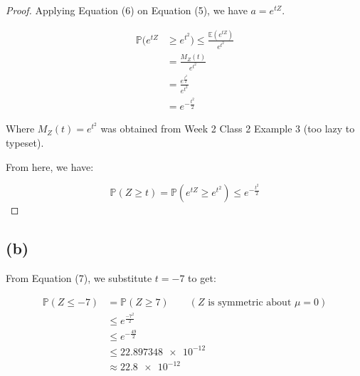 \documentclass[12pt]{article}
\begin{document}
\begin{proof} Applying Equation (6) on Equation (5), we have $a = e^{tZ}$. 

\begin{align*}
    \mathbb{P}(e^{tZ} &\geq e^{t^{2}}) \leq \frac{ \mathbb{E}(e^{tZ})}{e^{t^{2}}} \\ 
    &= \frac{M_Z (t)}{e^{t^{2}}} \\ 
    &= \frac{e^{\frac{t^{2}}{2}}}{e^{t^{2}}} \\ 
    &= e^{-\frac{t^{2}}{2}}
\end{align*}

\noindent Where $M_Z (t) = e^{t^{2}}$ was obtained from Week 2 Class 2 Example 3 (too lazy to typeset).

\noindent From here, we have:

\begin{equation}
    \boxed{ \mathbb{P}(Z \geq t) = \mathbb{P}(e^{tZ} \geq e^{t^{2}}) \leq e^{-\frac{t^{2}}{2}}}
\end{equation}

\end{proof}

\subsection*{(b)}
From Equation (7), we substitute $t = -7$ to get: 

\begin{align*}
    \mathbb{P}(Z \leq -7) &= \mathbb{P}(Z \geq 7) \qquad (\text{$Z$ is symmetric about $\mu=0$}) \\ 
    &\leq  e^{\frac{-7^{2}}{2}} \\ 
    &\leq  e^{-\frac{49}{2}} \\ 
    &\leq  \num{22.897348e-12} \\ 
    &\approx \boxed{\num{22.8e-12}}
\end{align*}
\end{document}
